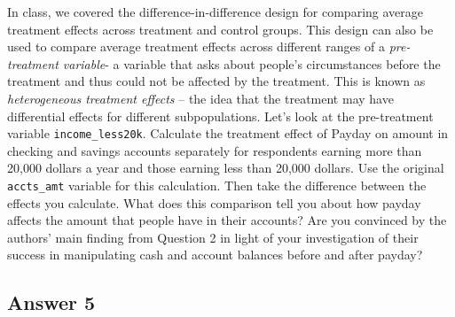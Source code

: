 \documentclass[
]{article}
\begin{document}
In class, we covered the difference-in-difference design for comparing
average treatment effects across treatment and control groups. This
design can also be used to compare average treatment effects across
different ranges of a \emph{pre-treatment variable}- a variable that
asks about people's circumstances before the treatment and thus could
not be affected by the treatment. This is known as \emph{heterogeneous
treatment effects} -- the idea that the treatment may have differential
effects for different subpopulations. Let's look at the pre-treatment
variable \texttt{income\_less20k}. Calculate the treatment effect of
Payday on amount in checking and savings accounts separately for
respondents earning more than 20,000 dollars a year and those earning
less than 20,000 dollars. Use the original \texttt{accts\_amt} variable
for this calculation. Then take the difference between the effects you
calculate. What does this comparison tell you about how payday affects
the amount that people have in their accounts? Are you convinced by the
authors' main finding from Question 2 in light of your investigation of
their success in manipulating cash and account balances before and after
payday?

\hypertarget{answer-5}{%
\subsection{Answer 5}\label{answer-5}}
\end{document}
